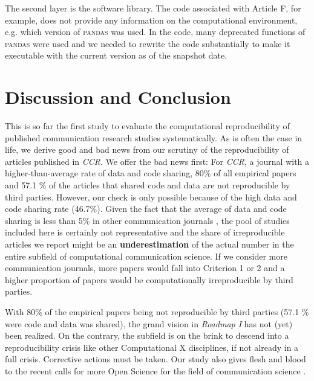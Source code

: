 The second layer is the software library. The code associated with Article {F}, for example, does not provide any information on the computational environment, e.g. which version of \textsc{pandas} was used. In the code, many deprecated functions of \textsc{pandas} were used and we needed to rewrite the code substantially to make it executable with the current version as of the snapshot date.

\section{Discussion and Conclusion}

This is so far the first study to evaluate the computational reproducibility of published communication research studies systematically. As is often the case in life, we derive good and bad news from our scrutiny of the reproducibility of articles published in \textit{CCR}. We offer the bad news first: For \textit{CCR}, a journal with a higher-than-average rate of data and code sharing, 80\% of all empirical papers and 57.1 \% of the articles that shared code and data are not reproducible by third parties. However, our check is only possible because of the high data and code sharing rate (46.7\%). Given the fact that the average of data and code sharing is less than 5\% in other communication journals \parencite[]{haim:2023:H,Knoepfle2024}, the pool of studies included here is certainly not representative and the share of irreproducible articles we report might be an \textbf{underestimation} of the actual number in the entire subfield of computational communication science. If we consider more communication journals, more papers would fall into Criterion 1 or 2 and a higher proportion of papers would be computationally irreproducible by third parties. 

With 80\% of the empirical papers being not reproducible by third parties (57.1 \% were code and data was shared), the grand vision in \textit{Roadmap I} has not (yet) been realized. On the contrary, the subfield is on the brink to descend into a reproducibility crisis like other Computational X disciplines, if not already in a full crisis. Corrective actions must be taken. Our study also gives flesh and blood to the recent calls for more Open Science for the field of communication science  \parencite[]{dienlin:2020:AOS,bowman:2020:CBP,lewis:2019:OCS}.

